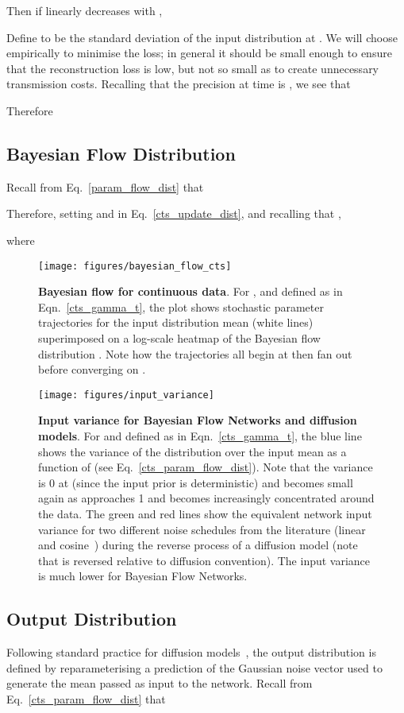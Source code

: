 \documentclass[11pt,table]{article}
\newcommand{\0}[1]{\constvec{0}{#1}}
\newcommand{\1}[1]{\constvec{1}{#1}}
\begin{document}
Then if  linearly decreases with ,

Define  to be the standard deviation of the input distribution at . 
We will choose  empirically to minimise the loss; in general it should be small enough to ensure that the reconstruction loss is low, but not so small as to create unnecessary transmission costs.
Recalling that the precision  at time  is , we see that

Therefore

\subsection{Bayesian Flow Distribution \texorpdfstring{}{}}
Recall from Eq.~\ref{param_flow_dist} that

Therefore, setting  and  in Eq.~\ref{cts_update_dist}, and recalling that ,

where

\begin{figure}[t!]
\texttt{[image: figures/bayesian\_flow\_cts]}
\caption{\textbf{Bayesian flow for continuous data}. For ,  and  defined as in Eqn.~\ref{cts_gamma_t}, the plot shows stochastic parameter trajectories for the input distribution mean  (white lines) superimposed on a log-scale heatmap of the Bayesian flow distribution . Note how the trajectories all begin at  then fan out before converging on .}
\label{fig:cts_param_flow}
\end{figure}

\begin{figure}[t]
\centering
\texttt{[image: figures/input\_variance]}
\caption{\textbf{Input variance for Bayesian Flow Networks and diffusion models}. For  and  defined as in Eqn.~\ref{cts_gamma_t}, the blue line shows the variance  of the distribution over the input mean  as a function of  (see Eq.~\ref{cts_param_flow_dist}). Note that the variance is 0 at  (since the input prior  is deterministic) and becomes small again as  approaches 1 and  becomes increasingly concentrated around the data. The green and red lines show the equivalent network input variance for two different noise schedules from the literature (linear~\citep{ ho2020denoising} and cosine~\citep{ nichol2021improved}) during the reverse process of a diffusion model (note that  is reversed relative to diffusion convention). The input variance is much lower for Bayesian Flow Networks.}
\end{figure}
\subsection{Output Distribution \texorpdfstring{}{}}\label{sec:cts_output}
Following standard practice for diffusion models~\citep{song2020score}, the output distribution is defined by reparameterising a prediction of the Gaussian noise vector  used to generate the mean  passed as input to the network.
Recall from Eq.~\ref{cts_param_flow_dist} that
\end{document}
